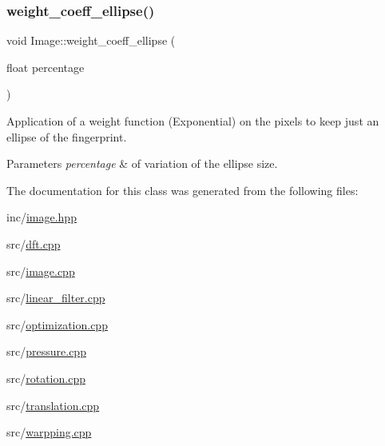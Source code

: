 \subsubsection{\texorpdfstring{weight\+\_\+coeff\+\_\+ellipse()}{weight\_coeff\_ellipse()}}
{\footnotesize\ttfamily void Image\+::weight\+\_\+coeff\+\_\+ellipse (\begin{DoxyParamCaption}\item[{float}]{percentage }\end{DoxyParamCaption})}



Application of a weight function (Exponential) on the pixels to keep just an ellipse of the fingerprint. 


\begin{DoxyParams}{Parameters}
{\em percentage} & of variation of the ellipse size. \\
\hline
\end{DoxyParams}


The documentation for this class was generated from the following files\+:\begin{DoxyCompactItemize}
\item 
inc/\hyperlink{image_8hpp}{image.\+hpp}\item 
src/\hyperlink{dft_8cpp}{dft.\+cpp}\item 
src/\hyperlink{image_8cpp}{image.\+cpp}\item 
src/\hyperlink{linear__filter_8cpp}{linear\+\_\+filter.\+cpp}\item 
src/\hyperlink{optimization_8cpp}{optimization.\+cpp}\item 
src/\hyperlink{pressure_8cpp}{pressure.\+cpp}\item 
src/\hyperlink{rotation_8cpp}{rotation.\+cpp}\item 
src/\hyperlink{translation_8cpp}{translation.\+cpp}\item 
src/\hyperlink{warpping_8cpp}{warpping.\+cpp}\end{DoxyCompactItemize}
